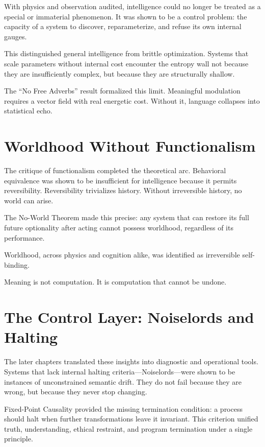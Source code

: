 \documentclass[11pt]{book}
\begin{document}
With physics and observation audited, intelligence could no longer be treated as
a special or immaterial phenomenon. It was shown to be a control problem: the
capacity of a system to discover, reparameterize, and refuse its own internal
gauges.

This distinguished general intelligence from brittle optimization. Systems that
scale parameters without internal cost encounter the entropy wall not because
they are insufficiently complex, but because they are structurally shallow.

The “No Free Adverbs” result formalized this limit. Meaningful modulation requires
a vector field with real energetic cost. Without it, language collapses into
statistical echo.

\section{Worldhood Without Functionalism}

The critique of functionalism completed the theoretical arc. Behavioral
equivalence was shown to be insufficient for intelligence because it permits
reversibility. Reversibility trivializes history. Without irreversible history,
no world can arise.

The No-World Theorem made this precise: any system that can restore its full
future optionality after acting cannot possess worldhood, regardless of its
performance.

Worldhood, across physics and cognition alike, was identified as irreversible
self-binding.

Meaning is not computation.
It is computation that cannot be undone.

\section{The Control Layer: Noiselords and Halting}

The later chapters translated these insights into diagnostic and operational
tools. Systems that lack internal halting criteria—Noiselords—were shown to be
instances of unconstrained semantic drift. They do not fail because they are
wrong, but because they never stop changing.

Fixed-Point Causality provided the missing termination condition: a process
should halt when further transformations leave it invariant. This criterion
unified truth, understanding, ethical restraint, and program termination under
a single principle.
\end{document}
